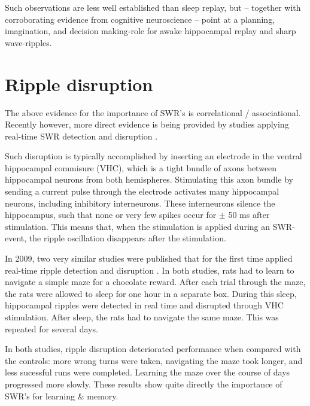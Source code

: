 Such observations are less well established than sleep replay, but -- together with corroborating evidence from cognitive neuroscience\footnotemark{} -- point at a planning, imagination, and decision making-role for awake hippocampal replay and sharp wave-ripples.





\section{Ripple disruption}
\label{sec:disruption}

The above evidence for the importance of SWR's is correlational / associational. Recently however, more direct evidence is being provided by studies applying real-time SWR detection and disruption \cite{Ego-Stengel2009,Girardeau2009,Jadhav2012,Girardeau2014,Talakoub2016}.

Such disruption is typically accomplished by inserting an electrode in the ventral hippocampal commisure (VHC), which is a tight bundle of axons between hippocampal neurons from both hemispheres. Stimulating this axon bundle by sending a current pulse through the electrode activates many hippocampal neurons, including inhibitory interneurons. These interneurons silence the hippocampus, such that none or very few spikes occur for $\pm$ 50 ms after stimulation. This means that, when the stimulation is applied during an SWR-event, the ripple oscillation disappears after the stimulation.

In 2009, two very similar studies were published that for the first time applied real-time ripple detection and disruption \cite{Ego-Stengel2009,Girardeau2009}. In both studies, rats had to learn to navigate a simple maze for a chocolate reward. After each trial through the maze, the rats were allowed to sleep for one hour in a separate box. During this sleep, hippocampal ripples were detected in real time and disrupted through VHC stimulation. After sleep, the rats had to navigate the same maze. This was repeated for several days.

In both studies, ripple disruption deteriorated performance when compared with the controls:\footnotemark{} more wrong turns were taken, navigating the maze took longer, and less sucessful runs were completed. Learning the maze over the course of days progressed more slowly. These results show quite directly the importance of SWR's for learning \& memory.

